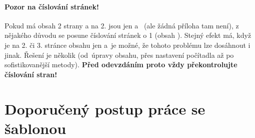 \paragraph {Pozor na číslování stránek!} Pokud má obsah 2 strany a na 2. jsou jen  a~ (ale žádná příloha tam není), z nějakého důvodu se posune číslování stránek o 1 (obsah ). Stejný efekt má, když je na 2. či 3. stránce obsahu jen  a~je možné, že tohoto problému lze dosáhnout i jinak. Řešení je několik (od~úpravy obsahu, přes nastavení počítadla až po sofistikovanější metody). \textbf{Před odevzdáním proto vždy překontrolujte číslování stran!}


\section{Doporučený postup práce se šablonou}

